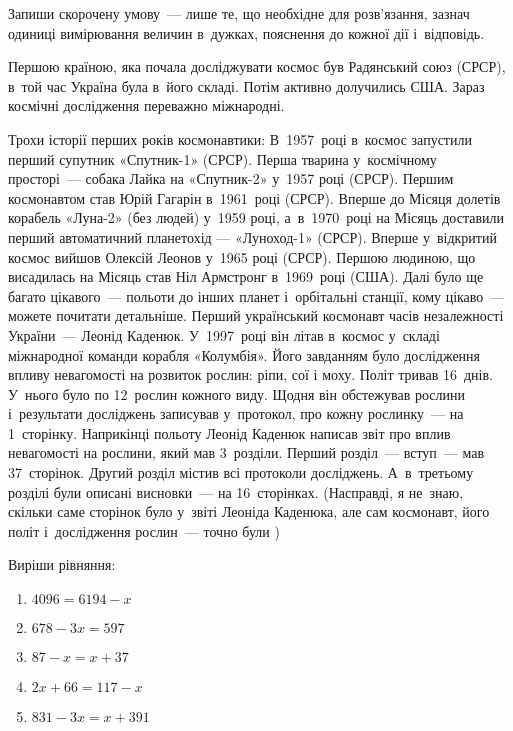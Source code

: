 \problem
Запиши скорочену умову~--- лише те, що необхідне для розв’язання,
зазнач одиниці вимірювання величин в~дужках, пояснення до кожної дії
і~відповідь.

Першою країною, яка почала досліджувати космос був Радянський союз (СРСР),
в~той час Україна була в~його складі. Потім активно долучились США.
Зараз космічні дослідження переважно міжнародні.

Трохи історії перших років космонавтики:
В~1957~році в~космос запустили перший супутник «Спутник-1» (СРСР).
Перша тварина у~космічному просторі~--- собака Лайка на «Спутник-2»
у~1957 році (СРСР).
Першим космонавтом став Юрій Гагарін в~1961~році (СРСР).
Вперше до Місяця долетів корабель «Луна-2» (без людей) у~1959 році,
а~в~1970~році на Місяць доставили перший автоматичний планетохід —
«Луноход-1» (СРСР).
Вперше у~відкритий космос вийшов Олексій Леонов у~1965 році (СРСР).
Першою людиною, що висадилась на Місяць став Ніл Армстронг в~1969~році (США).
Далі було ще багато цікавого~--- польоти до інших планет і~орбітальні станції,
кому цікаво~--- можете почитати детальніше.
Перший український космонавт часів незалежності України~--- Леонід Каденюк.
У~1997~році він літав в~космос у~складі міжнародної команди корабля «Колумбія».
Його завданням було дослідження впливу невагомості на розвиток рослин:
ріпи, сої і моху. Політ тривав 16~днів. У~нього було по 12~рослин кожного виду.
Щодня він обстежував рослини і~результати досліджень записував у~протокол,
про кожну рослинку~--- на 1~сторінку. Наприкінці польоту Леонід Каденюк
написав звіт про вплив невагомості на рослини, який мав 3~розділи.
Перший розділ~--- вступ~--- мав 37~сторінок. Другий розділ містив всі
протоколи досліджень. А~в~третьому розділі були описані висновки~---
на 16~сторінках.
(Насправді, я не~знаю, скільки саме сторінок було у~звіті Леоніда Каденюка,
але сам космонавт, його політ і~дослідження рослин~--- точно були \smiley)


\problem
Виріши рівняння:
\begin{multicols}{2}
    \begin{enumerate}
        \item $4096 = 6194 - x$
        \item $678 - 3x = 597$
        \item $87 - x = x + 37$
        \item $2x + 66 = 117 - x$
        \item $831 - 3x = x + 391$
    \end{enumerate}
\end{multicols}



